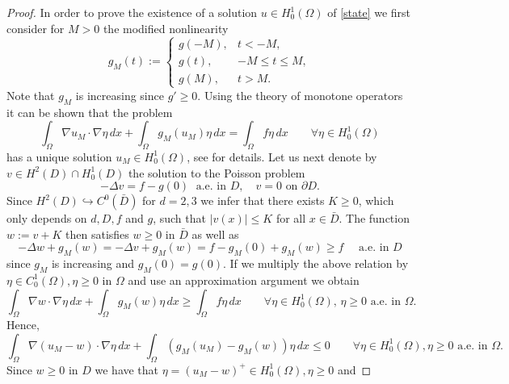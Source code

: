 \documentclass[a4paper,10pt]{article}
\newcommand{\dx}{\,dx}
\theoremstyle{plain}
\theoremstyle{plain}
\numberwithin{equation}{section}
\begin{document}
\begin{proof} In order to prove the existence of a solution $u \in H^1_0(\Omega)$ of
\eqref{state} we first consider for $M>0$ the modified nonlinearity
\begin{displaymath}
g_M(t):= \left\{
\begin{array}{cl}
g(-M), & t<-M, \\
g(t), & -M \leq t \leq M, \\
g(M), & t>M.
\end{array}
\right.
\end{displaymath}
Note that $g_M$ is increasing since $g' \geq 0$. 
Using the theory of monotone operators it can be shown that the problem
\begin{displaymath}
\int_\Omega \nabla u_M \cdot \nabla \eta \dx + \int_\Omega g_M(u_M) \eta \dx =
\int_\Omega f \eta \dx \qquad \forall \eta \in H^1_0(\Omega)
\end{displaymath}
has a unique solution $u_M \in H^1_0(\Omega)$, see \cite[Section 2.6]{VM25} for details.  Let us next denote by
$v \in H^2(D) \cap H^1_0(D)$ the solution to the Poisson problem
\begin{displaymath}
- \Delta v = f - g(0) \; \mbox{ a.e. in }  D, \quad v=0 \mbox{ on }  \partial D.  
\end{displaymath}
Since $H^2(D) \hookrightarrow C^0(\bar D)$ for $d=2,3$ we infer that there exists $K \geq 0$, which only depends on $d,D,f$ and $g$,
such that $| v(x) | \leq K$ for all $x \in \bar D$. The function $w:=v+K$ then satisfies
$w \geq 0$ in $\bar D$ as well as
\begin{displaymath}
- \Delta w + g_M(w) = -\Delta v + g_M(w) = f - g_M(0) + g_M(w) \geq f \quad \mbox{ a.e. in } D
\end{displaymath}
since $g_M$ is increasing and $g_M(0)=g(0)$. If we multiply the above relation by
$\eta \in C^1_0(\Omega), \eta \geq 0$ in  $\Omega$ and use an approximation argument we obtain
\begin{displaymath}
    \int_\Omega \nabla w \cdot \nabla \eta \dx + \int_\Omega g_M(w) \eta \dx \geq
    \int_\Omega f \eta \dx \qquad \forall \eta \in H^1_0(\Omega), \, \eta \geq 0 \mbox{ a.e. in } \Omega.
\end{displaymath}
Hence,
\begin{displaymath}
    \int_\Omega \nabla( u_M-w) \cdot \nabla \eta \dx + \int_\Omega (g_M(u_M)-g_M(w)) \eta \dx \leq
0 \qquad \forall \eta \in H^1_0(\Omega), \eta \geq 0 \mbox{ a.e. in } \Omega.
\end{displaymath}
Since $w \geq 0$ in $D$ we have that  $\eta =(u_M-w)^+ \in H^1_0(\Omega), \eta \geq 0$ and

\end{proof}
\end{document}
